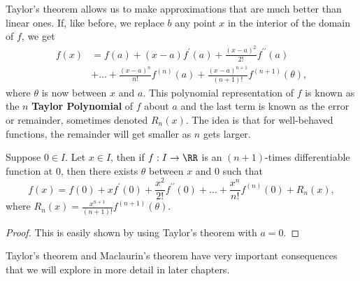 \documentclass[../real_analysis.tex]{subfiles}
\begin{document}
        Taylor's theorem allows us to make approximations that are much better than linear ones. If, like before, we replace $b$ any point $x$ in the interior of the domain of $f$, we get
        \begin{align}
            f(x)&=f(a)+(x-a)f^\prime(a)+\frac{(x-a)^2}{2!}f^{\prime\prime}(a)\\
            &+\dots+\frac{(x-
            a)^n}{n!}f^{(n)}(a)+\frac{(x-a)^{n+1}}{(n+1)!}f^{(n+1)}(\theta),
        \end{align}
        where $\theta$ is now between $x$ and $a$. This polynomial representation of $f$ is known as the $n$ \textbf{Taylor Polynomial} of $f$ about $a$ and the last term is known as the error or remainder, sometimes denoted $R_n(x)$. The idea is that for well-behaved functions, the remainder will get smaller as $n$ gets larger.
        \begin{corollary}
            Suppose $0\in I$. Let $x\in I$, then if $f:I\to\RR$ is an $(n+1)$-times differentiable function at 0, then there exists $\theta$ between $x$ and 0 such that
            \begin{equation}
                f(x)=f(0)+xf^\prime(0)+\frac{x^2}{2!}f^{\prime\prime}(0)+\dots+\frac{x^n}{n!}f^{(n)}(0)+R_n(x),
            \end{equation}
            where $R_n(x)=\frac{x^{n+1}}{(n+1)!}f^{(n+1)}(\theta)$.
        \end{corollary}
        \begin{proof}
            This is easily shown by using Taylor's theorem with $a=0$.
        \end{proof}
        Taylor's theorem and Maclaurin's theorem have very important consequences that we will explore in more detail in later chapters.
\end{document}
